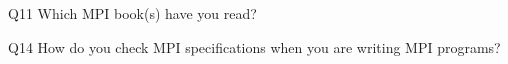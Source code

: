 \begin{description}%
\item{Q11} Which MPI book(s) have you read?%
\item{Q14} How do you check MPI specifications when you are writing MPI programs?%
\end{description}%
